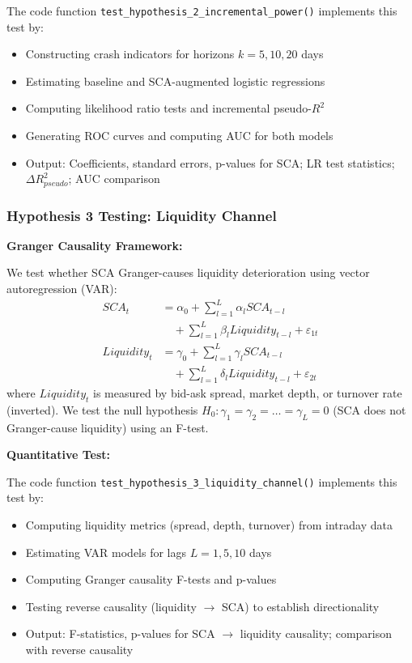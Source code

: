 \documentclass[preprint,12pt,authoryear]{elsarticle}
\begin{document}
The code function \texttt{test\_hypothesis\_2\_incremental\_power()} implements this test by:
\begin{itemize}
\item Constructing crash indicators for horizons $k = 5, 10, 20$ days
\item Estimating baseline and SCA-augmented logistic regressions
\item Computing likelihood ratio tests and incremental pseudo-$R^2$
\item Generating ROC curves and computing AUC for both models
\item Output: Coefficients, standard errors, p-values for SCA; LR test statistics; $\Delta R^2_{pseudo}$; AUC comparison
\end{itemize}

\subsubsection{Hypothesis 3 Testing: Liquidity Channel}

\noindent
\textbf{Granger Causality Framework:}

We test whether SCA Granger-causes liquidity deterioration using vector autoregression (VAR):
\begin{align}
SCA_t &= \alpha_0 + \sum_{l=1}^{L} \alpha_l SCA_{t-l} \\
&\quad + \sum_{l=1}^{L} \beta_l Liquidity_{t-l} + \varepsilon_{1t} \\
Liquidity_t &= \gamma_0 + \sum_{l=1}^{L} \gamma_l SCA_{t-l} \\
&\quad + \sum_{l=1}^{L} \delta_l Liquidity_{t-l} + \varepsilon_{2t}
\end{align}
where $Liquidity_t$ is measured by bid-ask spread, market depth, or turnover rate (inverted). We test the null hypothesis $H_0: \gamma_1 = \gamma_2 = \ldots = \gamma_L = 0$ (SCA does not Granger-cause liquidity) using an F-test.

\noindent
\textbf{Quantitative Test:}

The code function \texttt{test\_hypothesis\_3\_liquidity\_channel()} implements this test by:
\begin{itemize}
\item Computing liquidity metrics (spread, depth, turnover) from intraday data
\item Estimating VAR models for lags $L = 1, 5, 10$ days
\item Computing Granger causality F-tests and p-values
\item Testing reverse causality (liquidity $\to$ SCA) to establish directionality
\item Output: F-statistics, p-values for SCA $\to$ liquidity causality; comparison with reverse causality
\end{itemize}
\end{document}
